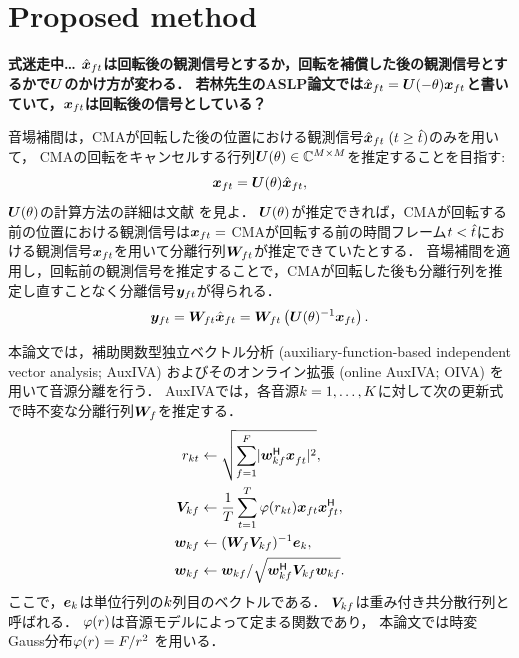 \documentclass{article}
\begin{document}
\section{Proposed method}
{%
  \color{red}\bf
  式迷走中… $\hat{\bm{x}} _{ft}$は回転後の観測信号とするか，回転を補償した後の観測信号とするかで$\bm{U}$のかけ方が変わる．
  若林先生のASLP論文では$\hat{\bm{x}} _{ft} = \bm{U} (-\theta) \bm{x} _{ft}$と書いていて，$\bm{x} _{ft}$は回転後の信号としている？
}

音場補間は，CMAが回転した後の位置における観測信号$\hat{\bm{x}} _{ft}\; (t \geq \hat{t})$のみを用いて，
CMAの回転をキャンセルする行列$\bm{U} (\theta) \in \mathbb{C} ^{M\times M}$を推定することを目指す:
\begin{equation}
  \bm{x} _{ft} = \bm{U} (\theta) \hat{\bm{x}} _{ft},
\end{equation}
$\bm{U} (\theta)$の計算方法の詳細は文献 \cite{Wakabayashi:2020:ASJ:A} を見よ．
$\bm{U} (\theta)$が推定できれば，CMAが回転する前の位置における観測信号は$\bm{x} _{ft} = $
CMAが回転する前の時間フレーム$t < \hat{t}$における観測信号$\bm{x} _{ft}$を用いて分離行列$\bm{W} _{ft}$が推定できていたとする．
音場補間を適用し，回転前の観測信号を推定することで，CMAが回転した後も分離行列を推定し直すことなく分離信号$\bm{y} _{ft}$が得られる．
\begin{equation}
  \bm{y} _{ft} = \bm{W} _{ft} \hat{\bm{x}} _{ft} = \bm{W} _{ft} \left(\bm{U} (\theta)^{-1} \bm{x} _{ft}\right).
\end{equation}

本論文では，補助関数型独立ベクトル分析 (auxiliary-function-based independent vector analysis; AuxIVA) \cite{Ono:2011:WASPAA}
およびそのオンライン拡張 (online AuxIVA; OIVA) \cite{Taniguchi:2014:HSCMA} を用いて音源分離を行う．
AuxIVAでは，各音源$k = 1, \dots, K$に対して次の更新式で時不変な分離行列$\bm{W} _{f}$を推定する．
\begin{align}
  \srcvar _{\src\tframe} &\gets \sqrt{\sum _{\freq=1} ^{\Freq} \lvert \demix ^{\hermite} _{\src\freq} \obs ^{\nohermite}_{\ft} \rvert ^2}, \\
  \cov _{\src\freq} &\gets \frac{1}{\Tframe} \sum _{\tframe=1} ^{\Tframe} \weight (\srcvar_{\src\tframe}) \obs _{\ft} \obs _{\ft}^{\hermite}, \\
  \demix _{\src\freq} &\gets (\Demix _{\freq} \cov _{\src\freq}) ^{-1} \bm{e} _{\src} \label{eq:ip:proj}, \\
  \demix _{\src\freq} &\gets {\demix _{\src\freq}} / {\sqrt{\demix _{\src\freq} ^{\hermite} \cov _{\src\freq} \demix _{\src\freq}}} \label{eq:ip:norm}.
\end{align}
ここで，$\bm{e}_{k}$は単位行列の$k$列目のベクトルである．
$\bm{V} _{kf}$は{重み付き共分散行列}と呼ばれる．
$\varphi(r)$は音源モデルによって定まる関数であり，
本論文では時変Gauss分布$\varphi (r) = F/{r ^2}$ \cite{Ono:2012:APSIPA}を用いる．
\end{document}

